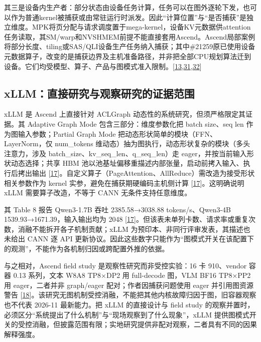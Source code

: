 \documentclass[
  UTF8,
  zihao=5]{ctexart}
\begin{document}
其三是设备内生产者：部分状态由设备任务计算，任务可以在图外逐轮下发，也可以作为普通kernel被捕获或由常驻运行时派发。因此``计算位置''与``是否捕获''是独立维度。MPK将页分配与请求调度置于mega-kernel，设备KV元数据供attention任务读取，其SM/warp和NVSHMEM前提不能直接套用Ascend。Ascend局部案例将部分长度、tiling或SAS/QLI设备生产任务纳入捕获；其中\#21259原已使用设备元数据算子，改变的是捕获边界及主机准备路径，并非把全部CPU规划算法迁到设备。它们均受模型、算子、产品与图模式准入限制。{[}\protect\hyperlink{ref-cheng2026mpk}{13},\protect\hyperlink{ref-vllmascendpr21259}{31},\protect\hyperlink{ref-vllmascendpr21281}{32}{]}

\hypertarget{xllmux76f4ux63a5ux7814ux7a76ux4e0eux89c2ux5bdfux7814ux7a76ux7684ux8bc1ux636eux8303ux56f4}{%
\subsection{xLLM：直接研究与观察研究的证据范围}\label{xllmux76f4ux63a5ux7814ux7a76ux4e0eux89c2ux5bdfux7814ux7a76ux7684ux8bc1ux636eux8303ux56f4}}

xLLM 是 Ascend 上直接针对 ACLGraph
动态性的系统研究，但须严格限定其证据。其 Adaptive Graph Mode
包含三部分：维度参数化把 batch size、seq len 作为图输入参数；Partial
Graph Mode 把动态形状简单的模块（FFN、LayerNorm，仅 num\_tokens
维动态）抽为图执行，动态形状复杂的模块（多头注意力，涉及
batch\_size、kv\_seq\_len、q\_seq\_len）走
eager，并按当前输入形状动态选择；共享 HBM
池以池基址偏移重描述内部张量，启动前拷入输入、执行后拷出输出
{[}\protect\hyperlink{ref-liu2025xllm}{17}{]}。自定义算子（PageAttention、AllReduce）需改造为接受形状相关参数作为
kernel 实参，避免在捕获期硬编码主机侧计算
{[}\protect\hyperlink{ref-liu2025xllm}{17}{]}。这明确说明 xLLM
需要算子改造，不等于 CANN 无条件支持任意维度。

其 Table 8 报告 Qwen3-1.7B 吞吐 2385.58→3038.88 tokens/s、Qwen3-4B
1539.93→1671.39，输入输出均为 2048
{[}\protect\hyperlink{ref-liu2025xllm}{17}{]}。但该表未单列卡数、请求率或重复次数，消融不能拆开各子机制贡献；xLLM
为预印本、非同行评审发表，其描述也未给出 CANN 逐 API
更新协议。因此这些数字只能作为``图模式开关在该配置下的观测''，不能作为各机制归因或跨配置外推的依据。

与之相对，Ascend field study 是观察性研究而非受控实验：16 卡 910、vendor
容器 0.13 系列，文本 W8A8 TP8×DP2 用 full-decode 图，VLM BF16 TP8×PP2 用
eager，二者并非 graph/eager 配对；作者因捕获问题使用 eager
并引用图资源警告
{[}\protect\hyperlink{ref-yu2026ascendfield}{18}{]}。该研究无图机制受控消融，不能把其他内核故障归因于图，旧容器观察也不代表
2026-11 最新能力。把 xLLM 的直接设计与 field study
的观察并置时，必须区分``系统提出了什么机制''与``现场观察到了什么现象''，xLLM
提供图模式开关的受控消融，但披露范围有限；实地研究提供非配对观察，二者具有不同的因果解释强度。
\end{document}
